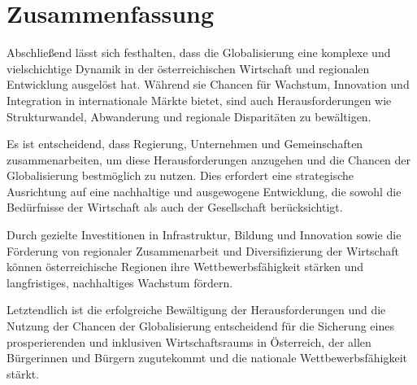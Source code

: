 \section{Zusammenfassung}

Abschließend lässt sich festhalten, dass die Globalisierung eine komplexe und vielschichtige Dynamik in der österreichischen Wirtschaft und regionalen Entwicklung ausgelöst hat. Während sie Chancen für Wachstum, Innovation und Integration in internationale Märkte bietet, sind auch Herausforderungen wie Strukturwandel, Abwanderung und regionale Disparitäten zu bewältigen.

Es ist entscheidend, dass Regierung, Unternehmen und Gemeinschaften zusammenarbeiten, um diese Herausforderungen anzugehen und die Chancen der Globalisierung bestmöglich zu nutzen. Dies erfordert eine strategische Ausrichtung auf eine nachhaltige und ausgewogene Entwicklung, die sowohl die Bedürfnisse der Wirtschaft als auch der Gesellschaft berücksichtigt.

Durch gezielte Investitionen in Infrastruktur, Bildung und Innovation sowie die Förderung von regionaler Zusammenarbeit und Diversifizierung der Wirtschaft können österreichische Regionen ihre Wettbewerbsfähigkeit stärken und langfristiges, nachhaltiges Wachstum fördern.

Letztendlich ist die erfolgreiche Bewältigung der Herausforderungen und die Nutzung der Chancen der Globalisierung entscheidend für die Sicherung eines prosperierenden und inklusiven Wirtschaftsraums in Österreich, der allen Bürgerinnen und Bürgern zugutekommt und die nationale Wettbewerbsfähigkeit stärkt.